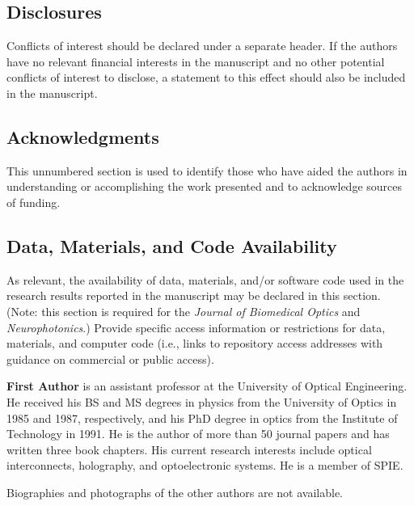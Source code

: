 \documentclass[12pt]{spieman}  %
\begin{document}
\begin{spacing}{2}


\subsection*{Disclosures}
Conflicts of interest should be declared under a separate header. If the authors have no relevant financial interests in the manuscript and no other potential conflicts of interest to disclose, a statement to this effect should also be included in the manuscript.

\subsection* {Acknowledgments}
This unnumbered section is used to identify those who have aided the authors in understanding or accomplishing the work presented and to acknowledge sources of funding.

\subsection* {Data, Materials, and Code Availability}
As relevant, the availability of data, materials, and/or software code used in the research results reported in the manuscript may be declared in this section. (Note: this section is required for the \textit{Journal of Biomedical Optics} and \textit{Neurophotonics}.) Provide specific access information or restrictions for data, materials, and computer code (i.e., links to repository access addresses with guidance on commercial or public access).





\vspace{2ex}\noindent\textbf{First Author} is an assistant professor at the University of Optical Engineering. He received his BS and MS degrees in physics from the University of Optics in 1985 and 1987, respectively, and his PhD degree in optics from the Institute of Technology in 1991.  He is the author of more than 50 journal papers and has written three book chapters. His current research interests include optical interconnects, holography, and optoelectronic systems. He is a member of SPIE.

\vspace{1ex}
\noindent Biographies and photographs of the other authors are not available.

\listoffigures
\listoftables

\end{spacing}
\end{document}
